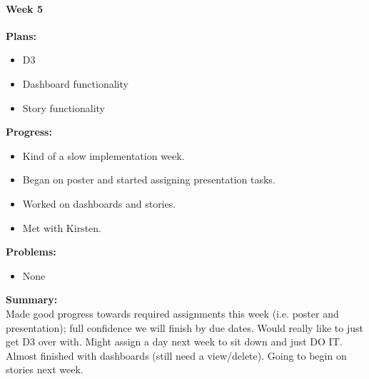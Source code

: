 \paragraph{Week 5}
\begin{adjustwidth}{2.5em}{0pt}
    \vspace{-0.5cm}\textbf{Plans:}
    \vspace{-0.5cm}
    \begin{itemize}
        \item D3
        \item Dashboard functionality
        \item Story functionality
    \end{itemize} 
    \vspace{-0.3cm}\textbf{Progress:}
    \vspace{-0.5cm}
    \begin{itemize}
        \item Kind of a slow implementation week.
        \item Began on poster and started assigning presentation tasks.
        \item Worked on dashboards and stories. 
        \item Met with Kirsten.
    \end{itemize} 
    \vspace{-0.3cm}\textbf{Problems:}
    \vspace{-0.5cm}
    \begin{itemize}
        \item None
    \end{itemize}  
    \vspace{-0.3cm}\noindent\textbf{Summary:}\\
    \noindent Made good progress towards required assignments this week (i.e. poster and presentation); full confidence we will finish by due dates. Would really like to just get D3 over with. Might assign a day next week to sit down and just DO IT. Almost finished with dashboards (still need a view/delete). Going to begin on stories next week. 
\end{adjustwidth} 
